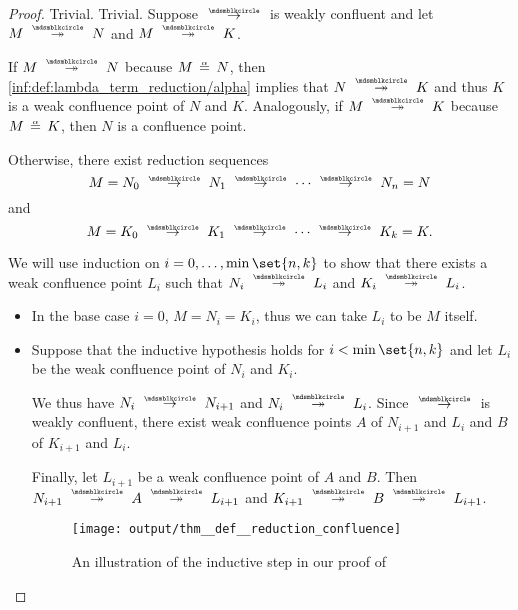 \begin{proof}
   Trivial.
   Trivial.
   Suppose \( {\pred} \) is weakly confluent and let \( M \pred* N \) and \( M \pred* K \).

  If \( M \pred* N \) because \( M \aequiv N \), then \ref{inf:def:lambda_term_reduction/alpha} implies that \( N \pred* K \) and thus \( K \) is a weak confluence point of \( N \) and \( K \). Analogously, if \( M \pred* K \) because \( M \aequiv K \), then \( N \) is a confluence point.

  Otherwise, there exist reduction sequences
  \begin{equation*}
    M = N_0 \pred N_1 \pred \cdots \pred N_n = N
  \end{equation*}
  and
  \begin{equation*}
    M = K_0 \pred K_1 \pred \cdots \pred K_k = K.
  \end{equation*}

  We will use induction on \( i = 0, \ldots, \min\set{ n, k } \) to show that there exists a weak confluence point \( L_i \) such that \( N_i \pred* L_i \) and \( K_i \pred* L_i \).

  \begin{itemize}
    \item In the base case \( i = 0 \), \( M = N_i = K_i \), thus we can take \( L_i \) to be \( M \) itself.

    \item Suppose that the inductive hypothesis holds for \( i < \min\set{ n, k } \) and let \( L_i \) be the weak confluence point of \( N_i \) and \( K_i \).

    We thus have \( N_i \pred N_{i+1} \) and \( N_i \pred* L_i \). Since \( {\pred} \) is weakly confluent, there exist weak confluence points \( A \) of \( N_{i+1} \) and \( L_i \) and \( B \) of \( K_{i+1} \) and \( L_i \).

    Finally, let \( L_{i+1} \) be a weak confluence point of \( A \) and \( B \). Then \( N_{i+1} \pred* A \pred* L_{i+1} \) and \( K_{i+1} \pred* B \pred* L_{i+1} \).

    \begin{figure}[!ht]
      \centering
      \texttt{[image: output/thm\_\_def\_\_reduction\_confluence]}
      \caption{An illustration of the inductive step in our proof of }\label{fig:thm:confluence_of_reflexive_transitive_closure}
    \end{figure}
  \end{itemize}


\end{proof}
